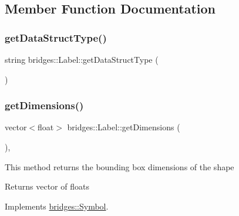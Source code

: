 \subsection{Member Function Documentation}
\mbox{\label{classbridges_1_1_label_a737053b6e94767959572f9985ea375c8}} 
\subsubsection{\texorpdfstring{getDataStructType()}{getDataStructType()}}
{\footnotesize\ttfamily string bridges\+::\+Label\+::get\+Data\+Struct\+Type (\begin{DoxyParamCaption}{ }\end{DoxyParamCaption})\hspace{0.3cm}{\ttfamily [inline]}}

\mbox{\label{classbridges_1_1_label_a97d5638f629edbd6733b8f8572ca42ba}} 
\subsubsection{\texorpdfstring{getDimensions()}{getDimensions()}}
{\footnotesize\ttfamily vector$<$float$>$ bridges\+::\+Label\+::get\+Dimensions (\begin{DoxyParamCaption}{ }\end{DoxyParamCaption})\hspace{0.3cm}{\ttfamily [inline]}, {\ttfamily [virtual]}}

This method returns the bounding box dimensions of the shape

\begin{DoxyReturn}{Returns}
vector of floats 
\end{DoxyReturn}


Implements \mbox{\hyperlink{classbridges_1_1_symbol_a6eb190dc71b31b344b7610a07c6dc1d5}{bridges\+::\+Symbol}}.

\mbox{\label{classbridges_1_1_label_a630528ede3c5cc77548aeec886b92c1c}} 
